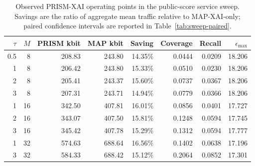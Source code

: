 \begin{table}[htbp]

\caption{Observed PRISM-XAI operating points in the public-score service sweep. Savings are the ratio of aggregate mean traffic relative to MAP-XAI-only; paired confidence intervals are reported in Table~\ref{tab:sweep-paired}.}

\label{tab:sweep-means}

\centering\scriptsize

\begin{tabular}{rrrrrrrr}

\toprule

$\tau$ & $M$ & PRISM kbit & MAP kbit & Saving & Coverage & Recall & $\epsilon_{\max}$\\

\midrule

0.5 & 8 & 208.83 & 243.80 & 14.35\% & 0.0444 & 0.0209 & 18.206\\

1 & 8 & 206.42 & 243.80 & 15.33\% & 0.0510 & 0.0230 & 18.206\\

2 & 8 & 205.41 & 243.37 & 15.60\% & 0.0737 & 0.0367 & 18.206\\

3 & 8 & 207.31 & 243.71 & 14.94\% & 0.0779 & 0.0366 & 18.206\\

1 & 16 & 342.50 & 407.81 & 16.01\% & 0.0856 & 0.0401 & 17.727\\

2 & 16 & 343.07 & 407.50 & 15.81\% & 0.1248 & 0.0594 & 17.745\\

3 & 16 & 345.42 & 407.78 & 15.29\% & 0.1312 & 0.0594 & 17.777\\

1 & 32 & 574.63 & 688.64 & 16.56\% & 0.1402 & 0.0638 & 17.196\\

3 & 32 & 584.33 & 688.42 & 15.12\% & 0.2064 & 0.0852 & 17.301\\

\bottomrule

\end{tabular}

\end{table}

